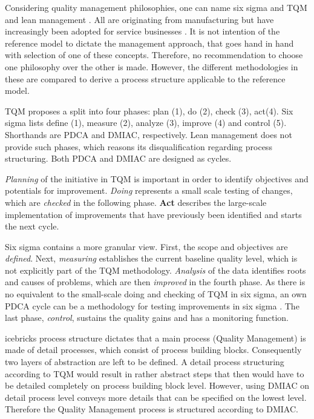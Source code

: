 		Considering quality management philosophies, one can name six sigma and \acrshort{TQM} and lean management \citep{Andersson_2006}. All are originating from manufacturing but have increasingly been adopted for service businesses \citep{Antony_2007}. It is not intention of the reference model to dictate the management approach, that goes hand in hand with selection of one of these concepts. Therefore, no recommendation to choose one philosophy over the other is made. However, the different methodologies in these are compared to derive a process structure applicable to the reference model. 
		
		\acrshort{TQM} proposes a split into four phases: plan (1), do (2), check (3), act(4). Six sigma lists define (1), measure (2), analyze (3), improve (4) and control (5). Shorthands are \acrshort{PDCA} and \acrshort{DMIAC}, respectively. Lean management does not provide such phases, which reasons its disqualification regarding process structuring. Both \acrshort{PDCA} and \acrshort{DMIAC} are designed as cycles. 
		
		\textit{Planning} of the initiative in \acrshort{TQM} is important in order to identify objectives and potentials for improvement. \textit{Doing} represents a small scale testing of changes, which are \textit{checked} in the following phase. \textbf{Act} describes the large-scale implementation of improvements that have previously been identified and starts the next cycle. 
		
		 Six sigma contains a more granular view. First, the scope and objectives are \textit{defined}. Next, \textit{measuring} establishes the current baseline quality level, which is not explicitly part of the \acrshort{TQM} methodology. \textit{Analysis} of the data identifies roots and causes of problems, which are then \textit{improved} in the fourth phase. As there is no equivalent to the small-scale doing and checking of \acrshort{TQM} in six sigma, an own \acrshort{PDCA} cycle can be a methodology for testing improvements in six sigma \citep{9780071840538}. The last phase, \textit{control}, sustains the quality gains and has a monitoring function.
		 
		 icebricks process structure dictates that a main process (Quality Management) is made of detail processes, which consist of process building blocks. Consequently two layers of abstraction are left to be defined. A detail process structuring according to \acrshort{TQM} would result in rather abstract steps that then would have to be detailed completely on process building block level. However, using \acrshort{DMIAC} on detail process level conveys more details that can be specified on the lowest level. Therefore the Quality Management process is structured according to \acrshort{DMIAC}. 
		 
